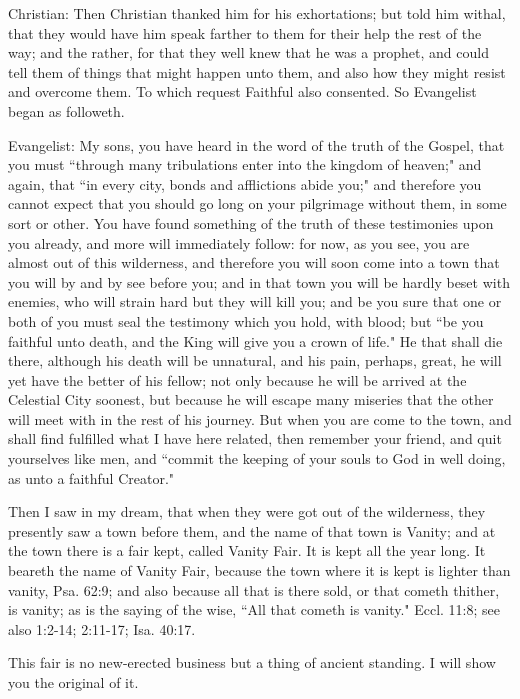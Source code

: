 Christian: Then Christian thanked him for his exhortations; but told him withal, that they would have him speak farther to them for their help the rest of the way; and the rather, for that they well knew that he was a prophet, and could tell them of things that might happen unto them, and also how they might resist and overcome them. To which request Faithful also consented. So Evangelist began as followeth.

Evangelist: My sons, you have heard in the word of the truth of the Gospel, that you must ``through many tribulations enter into the kingdom of heaven;" and again, that ``in every city, bonds and afflictions abide you;" and therefore you cannot expect that you should go long on your pilgrimage without them, in some sort or other. You have found something of the truth of these testimonies upon you already, and more will immediately follow: for now, as you see, you are almost out of this wilderness, and therefore you will soon come into a town that you will by and by see before you; and in that town you will be hardly beset with enemies, who will strain hard but they will kill you; and be you sure that one or both of you must seal the testimony which you hold, with blood; but ``be you faithful unto death, and the King will give you a crown of life." He that shall die there, although his death will be unnatural, and his pain, perhaps, great, he will yet have the better of his fellow; not only because he will be arrived at the Celestial City soonest, but because he will escape many miseries that the other will meet with in the rest of his journey. But when you are come to the town, and shall find fulfilled what I have here related, then remember your friend, and quit yourselves like men, and ``commit the keeping of your souls to God in well doing, as unto a faithful Creator."

Then I saw in my dream, that when they were got out of the wilderness, they presently saw a town before them, and the name of that town is Vanity; and at the town there is a fair kept, called Vanity Fair. It is kept all the year long. It beareth the name of Vanity Fair, because the town where it is kept is lighter than vanity, Psa. 62:9; and also because all that is there sold, or that cometh thither, is vanity; as is the saying of the wise, ``All that cometh is vanity." Eccl. 11:8; see also 1:2-14; 2:11-17; Isa. 40:17.

This fair is no new-erected business but a thing of ancient standing. I will show you the original of it.

